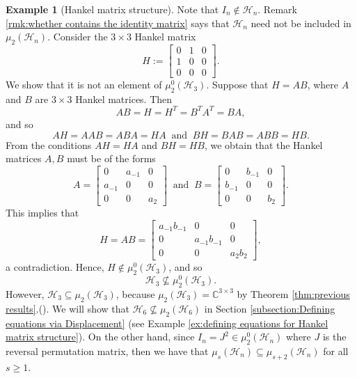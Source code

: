\documentclass[reqno]{amsart}
\theoremstyle{definition}
\newtheorem{example}[theorem]{Example}
\numberwithin{equation}{section}
\begin{document}
\begin{example}[Hankel matrix structure]
    Note that $I_n \notin \mathcal{H}_n$. Remark \ref{rmk:whether contains the identity matrix} says that $\mathcal{H}_n$ need not be included in $\mu_2(\mathcal{H}_n)$. Consider the $3 \times 3$ Hankel matrix
    \begin{equation*}
        H:=\begin{bmatrix}
            0 & 1 & 0 \\
            1 & 0 & 0\\
            0 & 0 &0
        \end{bmatrix}.
    \end{equation*}
    We show that it is not an element of $\mu_2^0(\mathcal{H}_3)$. Suppose that $H=AB$, where $A$ and $B$ are $3 \times 3$ Hankel matrices. Then 
    \begin{equation*}
        AB=H=H^T=B^TA^T=BA,
    \end{equation*}
    and so 
    \begin{equation*}
        AH=AAB=ABA=HA~\text{ and }~BH=BAB=ABB=HB.
    \end{equation*}
    From the conditions $AH=HA$ and $BH=HB$, we obtain that the Hankel matrices $A,B$ must be of the forms
    \begin{equation*}
        A=\begin{bmatrix}
            0 & a_{-1} & 0\\
            a_{-1} & 0 & 0\\
            0  & 0 & a_2
        \end{bmatrix}~\text{ and }~B=\begin{bmatrix}
            0 & b_{-1} & 0\\
            b_{-1} & 0 & 0\\
            0  & 0 & b_2
        \end{bmatrix}.
    \end{equation*}
    This implies that
    \begin{equation*}
        H=AB=\begin{bmatrix}
            a_{-1}b_{-1} & 0 & 0\\
            0 & a_{-1}b_{-1} & 0\\
            0 & 0 & a_2b_2
        \end{bmatrix},
    \end{equation*}
    a contradiction. Hence, $H \notin \mu_2^0(\mathcal{H}_3)$, and so 
    \begin{equation*}
        \mathcal{H}_3 \nsubseteq \mu_2^0(\mathcal{H}_3).
    \end{equation*}
    However, $\mathcal{H}_3 \subseteq \mu_2(\mathcal{H}_3)$, because $\mu_2(\mathcal{H}_3)=\mathbb{C}^{3 \times 3}$ by Theorem \ref{thm:previous results}.(). We will show that $\mathcal{H}_6 \nsubseteq \mu_2(\mathcal{H}_6)$ in Section \ref{subsection:Defining equations via Displacement} (see Example \ref{ex:defining equations for Hankel matrix structure}). On the other hand, since $I_n=J^2 \in \mu_2^0(\mathcal{H}_n)$ where $J$ is the reversal permutation matrix, then we have that $\mu_s(\mathcal{H}_n) \subseteq \mu_{s+2}(\mathcal{H}_n)$ for all $s \geq 1$.
\end{example}
\end{document}
